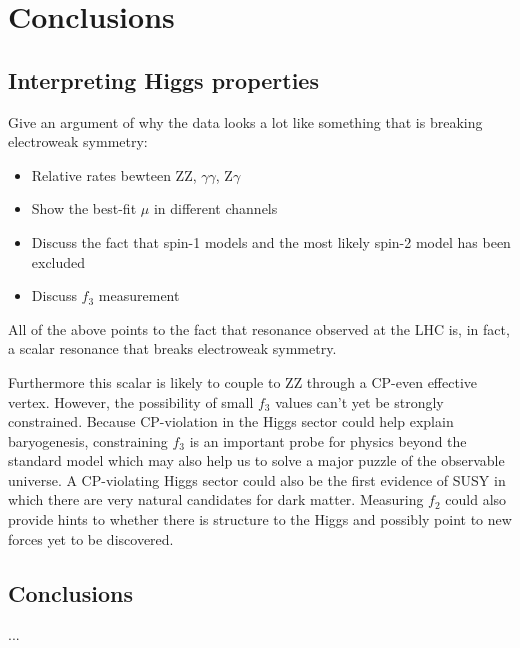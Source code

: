 



\chapter{Conclusions}
\label{sec:Conclusions}

\section{Interpreting Higgs properties}

Give an argument of why the data looks a lot like 
something that is breaking electroweak symmetry:

\begin{itemize}
  \item Relative rates bewteen ZZ, $\gamma\gamma$, Z$\gamma$
  \item Show the best-fit $\mu$ in different channels
  \item Discuss the fact that spin-1 models and the most 
    likely spin-2 model has been excluded
  \item Discuss $f_3$ measurement
\end{itemize}

All of the above points to the fact that resonance observed
at the LHC is, in fact, a scalar resonance that breaks electroweak 
symmetry.  


Furthermore this scalar is likely to couple to 
ZZ through a CP-even effective vertex.  However, the possibility
of small $f_3$ values can't yet be strongly constrained.  Because 
CP-violation in the Higgs sector could help explain 
baryogenesis, constraining $f_3$ is an important probe for physics
beyond the standard model which may also help us to solve a major
puzzle of the observable universe.  
A CP-violating Higgs sector could also be the first evidence of 
SUSY in which there are very natural candidates for dark matter. 
Measuring $f_2$ could also
provide hints to whether there is structure to the Higgs and
possibly point to new forces yet to be discovered.  

\section{Conclusions}

...

